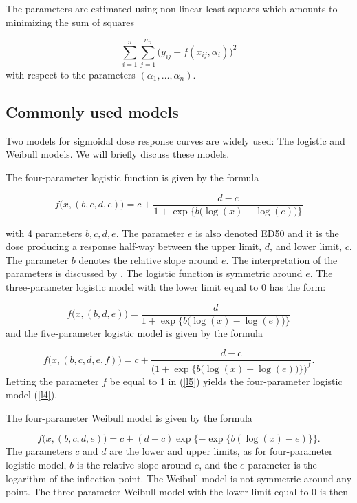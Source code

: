 \documentclass[a4paper]{article}
\begin{document}
The parameters are estimated using non-linear least squares which
amounts to minimizing the sum of squares 

\[ 
\sum_{i=1}^n \sum_{j=1}^{m_i} \big( y_{ij} - f (x_{ij}, \alpha_i) \big)^2 
\] 
with respect to the parameters $(\alpha_1, \ldots, \alpha_n)$.

\subsection{Commonly used models} \label{sec:2.1}

 
Two models for sigmoidal dose response curves are widely used: The logistic and Weibull models. We will briefly discuss these models. 
 
The four-parameter logistic function is given by the formula

\begin{equation} \label{l4}
f \big(x, (b,c,d,e) \big)=  c+\frac{d-c}{1+\exp \big\{b \big( \log(x)-\log(e) \big)  \big\}}
\end{equation}

\noindent with 4 parameters $b, c, d, e$. The parameter $e$ is also
denoted ED50 and it is the dose producing a response half-way
between the upper limit, $d$, and  lower limit, $c$. The parameter $b$ denotes
the relative slope around $e$.  The interpretation of the parameters is discussed by \citet{streibig&rudemo&jensen:1993}. The logistic function
is symmetric around $e$.
The three-parameter logistic model with the lower limit equal to 0 has the form:

\[ 
f \big(x, (b,d,e) \big)= \frac{d}{1+\exp \big\{b \big( \log(x)-\log(e) \big)  \big\}}
\]
and the five-parameter logistic model \citep{finney:1979} is given
by the formula

\begin{equation} \label{l5}
f \big(x, (b,c,d,e,f) \big) = c+\frac{d-c}{\big(1+\exp \big\{b \big( \log(x)-\log(e) \big) \big\} \big)^f}.
\end{equation}
Letting the parameter $f$ be equal to 1 in (\ref{l5}) yields the four-parameter logistic model (\ref{l4}). 

The four-parameter Weibull model is given by the formula

\begin{equation} \label{w4}
f \big(x, (b,c,d,e) \big) = c+(d-c) \exp\{ -\exp\{ b(\log (x)- e)\}  \}.
\end{equation}
The parameters $c$ and $d$ are the lower and upper
limits, as for four-parameter logistic model, $b$ is
the relative slope around $e$, and the $e$ parameter is the logarithm of the inflection point. The Weibull model is not symmetric around any point.
The three-parameter Weibull model with the lower limit equal to 0 is then
\end{document}
